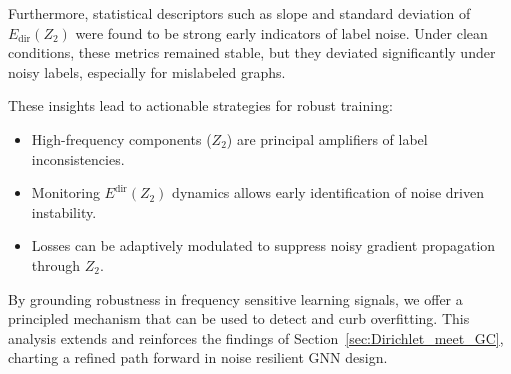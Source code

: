     
    



Furthermore, statistical descriptors such as slope and standard deviation of \( E_{\text{dir}}(Z_2) \) were found to be strong early indicators of label noise. Under clean conditions, these metrics remained stable, but they deviated significantly under noisy labels, especially for mislabeled graphs.

These insights lead to actionable strategies for robust training:

\begin{itemize}
    \item High-frequency components (\( Z_2 \)) are principal amplifiers of label inconsistencies.
    \item Monitoring \( E^{\text{dir}}(Z_2) \) dynamics allows early identification of noise driven instability.
    \item Losses can be adaptively modulated to suppress noisy gradient propagation through \( Z_2 \).
\end{itemize}

By grounding robustness in frequency sensitive learning signals, we offer a principled mechanism that can be used to detect and curb overfitting. This analysis extends and reinforces the findings of Section~\ref{sec:Dirichlet_meet_GC}, charting a refined path forward in noise resilient GNN design.
